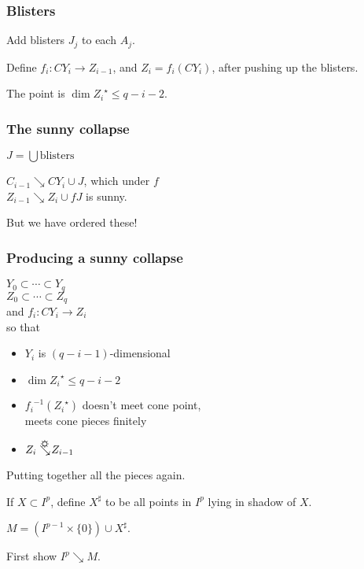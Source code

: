 \documentclass[14pt]{beamer}
\newcommand{\collapses}{\searrow}
\newcommand{\sunnycollapses}{\searrow\hspace{-12pt}\mbox{\raisebox{5pt}{\sun}}\hspace{2pt}}
\newcommand{\setbackgroundpicture}[1]{%
\usebackgroundtemplate{
\begin{pgfpicture}{0in}{0in}{\paperwidth}{\paperheight}
\pgfputat{\pgfxy(0,0)}{\texttt{[image: \#1]}}
\color{white}
\pgfsetfillopacity{0.8}
\pgfrect[fill]{\pgfxy(0,0)}{\pgfpoint{\paperwidth}{\paperheight}}
\end{pgfpicture}
}
}
\newcommand{\clearbackgroundpicture}{\usebackgroundtemplate{}}
\begin{document}
\begin{frame}
  \frametitle{Blisters}

  Add blisters $J_j$ to each $A_j$.

  Define $f_i : CY_i \to Z_{i-1}$, and $Z_i = f_i(CY_i)$, 
  after pushing up the blisters.

  The point is $\dim {Z_i}^\star \leq q-i-2$.
\end{frame}

\begin{frame}
  \frametitle{The sunny collapse}

  $J = \bigcup \mbox{blisters}$
  \vfill

  $C_{i-1} \collapses CY_i \cup J$, which under $f$\\
  $Z_{i-1} \collapses Z_i \cup fJ$ is sunny.

  \vfill
  But we have ordered these!
\end{frame}

\begin{frame}
  \frametitle{Producing a sunny collapse}

  $Y_0 \subset \cdots \subset Y_q$ \\
  $Z_0 \subset \cdots \subset Z_q$ \\
  and $f_i : CY_i \to Z_i$ \\
  so that
  \begin{itemize}
  \item $Y_i$ is $(q-i-1)$-dimensional 
  \item $\dim {Z_i}^\star \leq q-i-2$ \\
  \item ${f_i}^{-1}({Z_i}^\star)$ doesn't meet cone point, \\
    \quad meets cone pieces finitely
  \item ${Z_i} \sunnycollapses {Z_{i-1}}$
  \end{itemize}

\end{frame}



\setbackgroundpicture{puzzle.jpg}
\begin{frame}
\large
\vfill
\begin{center}
  Putting together all the pieces again.
\end{center}
\vfill  
\end{frame}
\clearbackgroundpicture

\begin{frame}
  If $X \subset I^p$, define $X^\sharp$ to be all points in $I^p$
  lying in shadow of $X$.

  \vfill
  \pause
  $M = \left(I^{p-1} \times \{0\}\right) \cup X^\sharp$.

\vfill
\pause
First show $I^p \collapses M$.
\end{frame}
\end{document}
